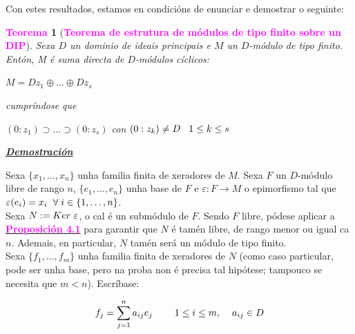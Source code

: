 \documentclass[twoside]{report}
\newcommand{\magbf}[1]{\textcolor{magenta}{\textbf{#1}}} %
\theoremstyle{mystyle}
\newtheorem{theo}{\magbf{Teorema}}[chapter]
\newenvironment{theorem}
{\begin{mdframed}[linecolor = magenta,backgroundcolor = classicrose, linewidth = 2mm]\begin{theo}}
{\end{theo}\end{mdframed}}
\begin{document}
\pagebreak

\noindent Con estes resultados, estamos en condicións de enunciar e demostrar o seguinte:\\

\begin{theorem}[\magbf{Teorema de estrutura de módulos de tipo finito sobre un DIP}] \label{th4.2}
Sexa $D$ un dominio de ideais principais e $M$ un $D$-módulo de tipo finito. Entón, M é suma directa de $D$-módulos cíclicos:
\begin{center}
    $M = Dz_{1} \oplus \dots \oplus Dz_{s}$ 
\end{center} 
cumpríndose que 
\begin{center}
    $(0 : z_{1}) \supset \dots \supset (0 : z_{s})$ \hspace{8mm} con $(0 : z_{k}) \neq D \hspace{3mm} 1 \leq k \leq s$ 
\end{center}
\end{theorem}

\vspace{2mm}

\noindent \textbf{\textit{\underline{Demostración}}}

\vspace{2mm}

\noindent Sexa $\{x_{1}, \dots, x_{n}\}$ unha familia finita de xeradores de $M$. Sexa $F$ un $D$-módulo libre de rango $n$, $\{e_{1}, \dots, e_{n}\}$ unha base de $F$ e $\varepsilon: F \longrightarrow M$ o epimorfismo tal que $\varepsilon(e_{i}) = x_{i} \hspace{2mm} \forall \hspace{1mm} i \in \{1, \dots, n\}$.\\

\noindent Sexa $N := Ker \hspace{1mm} \varepsilon$, o cal é un submódulo de $F$. Sendo $F$ libre, pódese aplicar a \hyperref[prop4.1]{\magbf{Proposición 4.1}} para garantir que $N$ é tamén libre, de rango menor ou igual ca $n$. Ademais, en particular, $N$ tamén será un módulo de tipo finito.\\

\noindent Sexa $\{f_{1}, \dots, f_{m}\}$ unha familia finita de xeradores de $N$ (como caso particular, pode ser unha base, pero na proba non é precisa tal hipótese; tampouco se necesita que $m < n$). Escríbase:

$$f_{j} = \displaystyle \sum_{j = 1}^{n}{a_{ij}e_{j}} \hspace{8mm} 1 \leq i \leq m, \hspace{4mm} a_{ij} \in D$$
\end{document}
